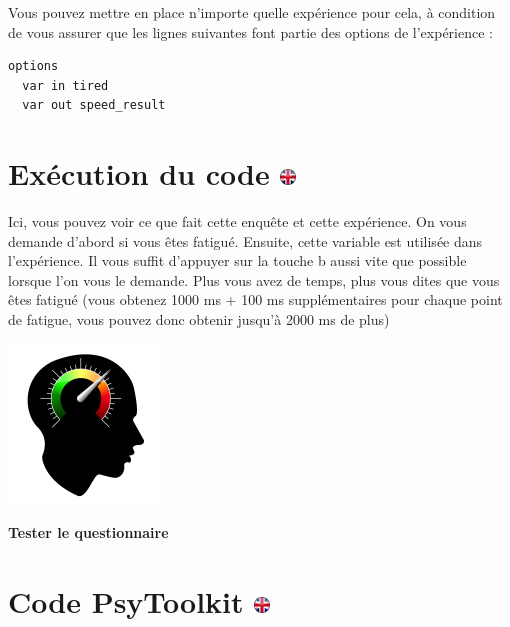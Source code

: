 \documentclass[
]{book}
\begin{document}
Vous pouvez mettre en place n'importe quelle expérience pour cela, à
condition de vous assurer que les lignes suivantes font partie des
options de l'expérience :

\begin{verbatim}
options
  var in tired
  var out speed_result
\end{verbatim}

\hypertarget{exuxe9cution-du-code}{%
\section[Exécution du code ]{\texorpdfstring{Exécution du code
\href{https://www.psytoolkit.org/lessons/var_in_out.html\#_running_the_code}{\protect\includegraphics{img/ukflag.png}}}{Exécution du code }}\label{exuxe9cution-du-code}}

Ici, vous pouvez voir ce que fait cette enquête et cette expérience. On
vous demande d'abord si vous êtes fatigué. Ensuite, cette variable est
utilisée dans l'expérience. Il vous suffit d'appuyer sur la touche b
aussi vite que possible lorsque l'on vous le demande. Plus vous avez de
temps, plus vous dites que vous êtes fatigué (vous obtenez 1000 ms + 100
ms supplémentaires pour chaque point de fatigue, vous pouvez donc
obtenir jusqu'à 2000 ms de plus)

\href{https://www.psytoolkit.org/cgi-bin/psy2.5.1/survey?s=mpXV3}{\includegraphics{img/RT.jpg}}

\textbf{Tester le questionnaire}

\hypertarget{code-psytoolkit}{%
\section[Code PsyToolkit ]{\texorpdfstring{Code PsyToolkit
\href{https://www.psytoolkit.org/lessons/var_in_out.html\#_the_psytoolkit_code}{\protect\includegraphics{img/ukflag.png}}}{Code PsyToolkit }}\label{code-psytoolkit}}
\end{document}
